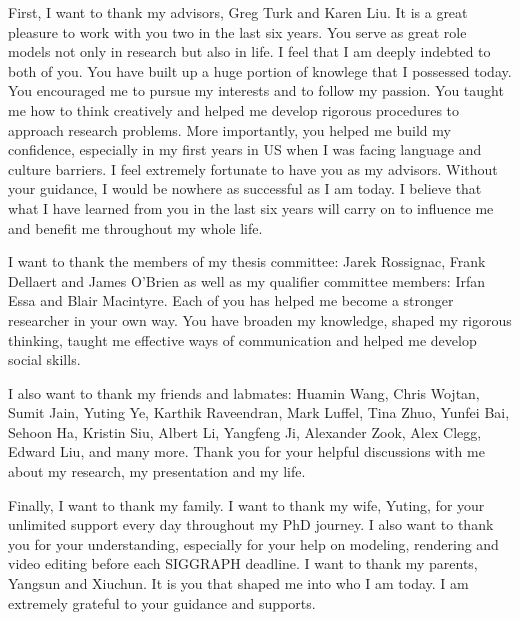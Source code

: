 First, I want to thank my advisors, Greg Turk and Karen Liu. It is a great pleasure to work with you two in the last six years. You serve as great role models not only in research but also in life. I feel that I am deeply indebted to both of you. You have built up a huge portion of knowlege that I possessed today. You encouraged me to pursue my interests and to follow my passion. You taught me how to think creatively and helped me develop rigorous procedures to approach research problems. More importantly, you helped me build my confidence, especially in my first years in US when I was facing language and culture barriers. I feel extremely fortunate to have you as my advisors. Without your guidance, I would be nowhere as successful as I am today. I believe that what I have learned from you in the last six years will carry on to influence me and benefit me throughout my whole life.

I want to thank the members of my thesis committee: Jarek Rossignac, Frank Dellaert and James O'Brien as well as my qualifier committee members: Irfan Essa and Blair Macintyre. Each of you has helped me become a stronger researcher in your own way. You have broaden my knowledge, shaped my rigorous thinking, taught me effective ways of communication and helped me develop social skills.

I also want to thank my friends and labmates: Huamin Wang, Chris Wojtan, Sumit Jain, Yuting Ye, Karthik Raveendran, Mark Luffel, Tina Zhuo, Yunfei Bai, Sehoon Ha, Kristin Siu, Albert Li, Yangfeng Ji, Alexander Zook, Alex Clegg, Edward Liu, and many more. Thank you for your helpful discussions with me about my research, my presentation and my life.

Finally, I want to thank my family. I want to thank my wife, Yuting, for your unlimited support every day throughout my PhD journey. I also want to thank you for your understanding, especially for your help on modeling, rendering and video editing before each SIGGRAPH deadline. I want to thank my parents, Yangsun and Xiuchun. It is you that shaped me into who I am today. I am extremely grateful to your guidance and supports.
